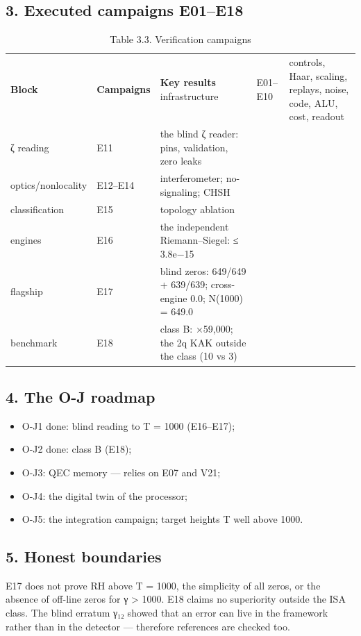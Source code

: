 \documentclass[11pt,a4paper]{article}
\begin{document}
\subsection{3. Executed campaigns E01–E18}

\begin{table}[htbp]\centering\small
\caption{Table 3.3. Verification campaigns}
\begin{tabular}{p{} p{} p{}}
\toprule
\textbf{Block} & \textbf{Campaigns} & \textbf{Key results}
\midrule
infrastructure & E01–E10 & controls, Haar, scaling, replays, noise, code, ALU, cost, readout \\
ζ reading & E11 & the blind ζ reader: pins, validation, zero leaks \\
optics/nonlocality & E12–E14 & interferometer; no-signaling; CHSH \\
classification & E15 & topology ablation \\
engines & E16 & the independent Riemann–Siegel: ≤ 3.8e−15 \\
flagship & E17 & blind zeros: 649/649 + 639/639; cross-engine 0.0; N(1000) = 649.0 \\
benchmark & E18 & class B: ×59,000; the 2q KAK outside the class (10 vs 3) \\
\bottomrule
\end{tabular}
\end{table}

\subsection{4. The O-J roadmap}

\begin{itemize}
  \item O-J1 done: blind reading to T = 1000 (E16–E17);
  \item O-J2 done: class B (E18);
  \item O-J3: QEC memory — relies on E07 and V21;
  \item O-J4: the digital twin of the processor;
  \item O-J5: the integration campaign; target heights T well above 1000.
\end{itemize}

\subsection{5. Honest boundaries}

E17 does not prove RH above T = 1000, the simplicity of all zeros, or the absence of off-line zeros for γ > 1000. E18 claims no superiority outside the ISA class. The blind erratum γ₁₂ showed that an error can live in the framework rather than in the detector — therefore references are checked too.
\end{document}
